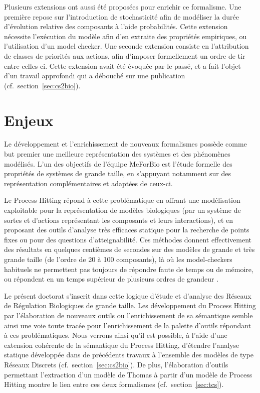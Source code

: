 Plusieurs extensions ont aussi été proposées pour enrichir ce formalisme.
Une première repose sur l'introduction de stochasticité afin de modéliser la durée d'évolution relative des composants à l'aide probabilités.
Cette extension nécessite l'exécution du modèle afin d'en extraite des propriétés empiriques, ou l'utilisation d'un model checker.
Une seconde extension consiste en l'attribution de classes de priorités aux actions, afin d'imposer formellement un ordre de tir entre celles-ci.
Cette extension avait été évoquée par le passé, et a fait l'objet d'un travail approfondi qui a débouché sur une publication (cf.~section~\ref{sec:cs2bio}).



\section{Enjeux}


Le développement et l'enrichissement de nouveaux formalismes possède comme but premier une meilleure représentation des systèmes et des phénomènes modélisés.
L'un des objectifs de l'équipe MeForBio est l'étude formelle des propriétés de systèmes de grande taille,
en s'appuyant notamment sur des représentation complémentaires et adaptées de ceux-ci.

Le Process Hitting répond à cette problématique en offrant une modélisation exploitable pour la représentation de modèles biologiques (par un système de sortes et d'actions représentant les composants et leurs interactions),
et en proposant des outils d'analyse très efficaces statique pour la recherche de points fixes ou pour des questions d'atteignabilité.
Ces méthodes donnent effectivement des résultats en quelques centièmes de secondes sur des modèles de grande et très grande taille (de l'ordre de 20 à 100 composants), là où les model-checkers habituels ne permettent pas toujours de répondre faute de temps ou de mémoire, ou répondent en un temps supérieur de plusieurs ordres de grandeur \cite{PMR12-MSCS}.

Le présent doctorat s'inscrit dans cette logique d'étude et d'analyse des Réseaux de Régulation Biologiques de grande taille.
Les développement du Process Hitting par l'élaboration de nouveaux outils ou l'enrichissement de sa sémantique semble ainsi une voie toute tracée pour l'enrichissement de la palette d'outils répondant à ces problématiques.
Nous verrons ainsi qu'il est possible, à l'aide d'une extension cohérente de la sémantique du Process Hitting, d'étendre l'analyse statique développée dans de précédents travaux à l'ensemble des modèles de type Réseaux Discrets (cf.~section~\ref{sec:cs2bio}).
De plus, l'élaboration d'outils permettant l'extraction d'un modèle de Thomas à partir d'un modèle de Process Hitting montre le lien entre ces deux formalismes (cf.~section~\ref{sec:tcs}).

